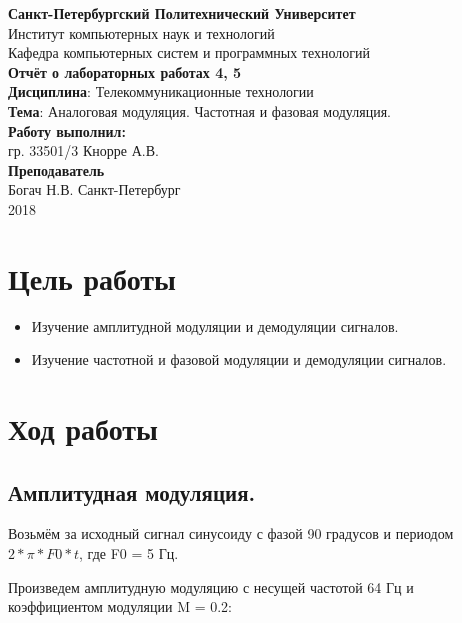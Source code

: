 \documentclass[a4paper,14pt]{extarticle}
\begin{document}
\begin{titlepage}
\centering 
{\bfseries Санкт-Петербургский Политехнический Университет} \\
Институт компьютерных наук и технологий \\
Кафедра компьютерных систем и программных технологий \\
\vspace{5cm}
{\centering \textbf{Отчёт о лабораторных работах 4, 5} \\ 
\vspace{0.2cm}
\textbf{Дисциплина}: Телекоммуникационные технологии \\
\vspace{0.2cm}
\textbf{Тема}: Аналоговая модуляция. Частотная и фазовая модуляция.} \\
\vspace{4cm}
\hfill {\bfseries Работу выполнил:}  \\
\hfill гр. 33501/3 Кнорре А.В. \\
\hfill {\bfseries Преподаватель}  \\
\hfill Богач Н.В.
\vfill
Санкт-Петербург \\
{\large 2018}
\end{titlepage}

\section{Цель работы}
\begin{itemize}
\item Изучение амплитудной модуляции и демодуляции сигналов. 

\item Изучение частотной и фазовой модуляции и демодуляции сигналов.
\end{itemize}

\section{Ход работы}

\subsection{Амплитудная модуляция.}

Возьмём за исходный сигнал синусоиду с фазой 90 градусов и периодом $2 * \pi * F0 * t$, где F0 = 5 Гц.

Произведем амплитудную модуляцию с несущей частотой 64 Гц и коэффициентом модуляции M = 0.2:
\end{document}
